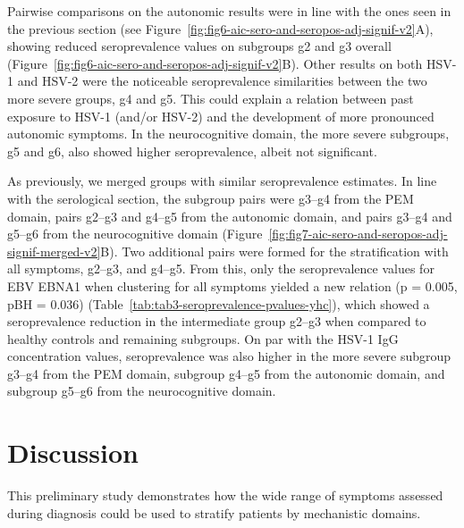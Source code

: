 Pairwise comparisons on the autonomic results were in line with the ones seen in the previous section (see Figure~\ref{fig:fig6-aic-sero-and-seropos-adj-signif-v2}A), showing reduced seroprevalence values on subgroups g2 and g3 overall (Figure~\ref{fig:fig6-aic-sero-and-seropos-adj-signif-v2}B).
Other results on both HSV-1 and HSV-2 were the noticeable seroprevalence similarities between the two more severe groups, g4 and g5.
This could explain a relation between past exposure to HSV-1 (and/or HSV-2) and the development of more pronounced autonomic symptoms.
In the neurocognitive domain, the more severe subgroups, g5 and g6, also showed higher seroprevalence, albeit not significant.

\bsni
As previously, we merged groups with similar seroprevalence estimates.
In line with the serological section, the subgroup pairs were g3--g4 from the PEM domain, pairs g2--g3 and g4--g5 from the autonomic domain, and pairs g3--g4 and g5--g6 from the neurocognitive domain (Figure~\ref{fig:fig7-aic-sero-and-seropos-adj-signif-merged-v2}B).
Two additional pairs were formed for the stratification with all symptoms, g2--g3, and g4--g5.
From this, only the seroprevalence values for EBV EBNA1 when clustering for all symptoms yielded a new relation (p = 0.005, pBH = 0.036) (Table~\ref{tab:tab3-seroprevalence-pvalues-yhc}), which showed a seroprevalence reduction in the intermediate group g2--g3 when compared to healthy controls and remaining \cfs subgroups.
On par with the HSV-1 IgG concentration values, seroprevalence was also higher in the more severe subgroup g3--g4 from the PEM domain, subgroup g4--g5 from the autonomic domain, and subgroup g5--g6 from the neurocognitive domain.


\section{Discussion}

This preliminary study demonstrates how the wide range of symptoms assessed during \cfs diagnosis could be used to stratify patients by mechanistic domains.

